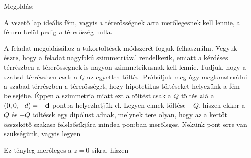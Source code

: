  
\ifdefined\megoldas

 Megoldás: 

 A vezető lap ideális fém, vagyis a térerősségnek arra merőlegesnek kell lennie, a fémen belül pedig a térerősség nulla.


 A feladat megoldásához a tükörtöltések módszerét fogjuk felhasználni. Vegyük észre, hogy a feladat nagyfokú szimmetriával rendelkezik, emiatt a kérdéses térrészben a térerősségnek is nagyon szimmetrikusnak kell lennie. Tudjuk, hogy a szabad térrészben csak a $Q$ az egyetlen töltés. Próbáljuk meg úgy megkonstruálni a szabad térrészben a térerősséget, hogy hipotetikus töltéseket helyezünk a fém belsejébe. Éppen a szimmetria miatt ezt a töltést csak a $Q$ töltés alá a $(0,0,-d)=-\mathbf{d}$ pontba helyezhetjük el. Legyen ennek töltése $-Q$, hiszen ekkor a $Q$ és $-Q$ töltések egy dipólust adnak, melynek tere olyan, hogy az a kettőt összekötő szakasz felelzősíkjára minden pontban merőleges. Nekünk pont erre van szükségünk, vagyis legyen

 Ez tényleg merőleges a $z=0$ síkra, hiszen
 
\fi